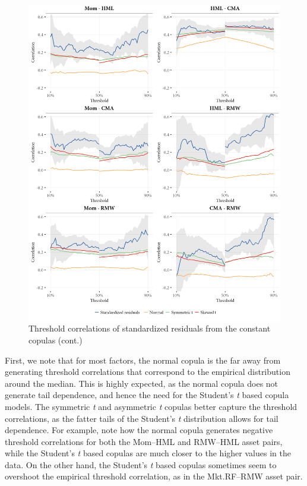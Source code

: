 \begin{figure}[!ht]
  \ContinuedFloat
  \centering
  \includegraphics[scale=1]{graphics/threshold_simulated_2.png}  
  \footnotesize
  \caption{Threshold correlations of standardized residuals from the constant copulas (cont.)}
\end{figure}
\pagebreak

First, we note that for most factors, the normal copula is the far away from generating threshold correlations that correspond to the empirical distribution around the median. This is highly expected, as the normal copula does not generate tail dependence, and hence the need for the Student's \textit{t} based copula models. The symmetric \textit{t} and asymmetric \textit{t} copulas better capture the threshold correlations, as the fatter tails of the Student's \textit{t} distribution allows for tail dependence. For example, note how the normal copula generates negative threshold correlations for both the Mom--HML and RMW--HML asset pairs, while the Student's \textit{t} based copulas are much closer to the higher values in the data. On the other hand, the Student's \textit{t} based copulas sometimes seem to overshoot the empirical threshold correlation, as in the Mkt.RF--RMW asset pair.

